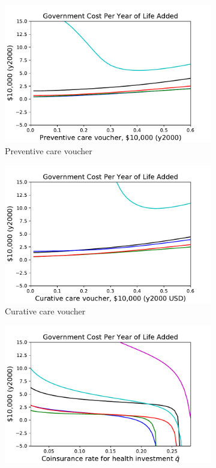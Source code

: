 \documentclass[12pt,pdftex,letterpaper]{article}
\begin{document}
\begin{figure}[h!]
    \centering
    \begin{subfigure}[b]{0.45\textwidth}
        \centering
        \includegraphics[width=\textwidth]{../Figures/PreventiveSubCostPerYear.pdf}
        \caption{Preventive care voucher}
    \end{subfigure}
    \begin{subfigure}[b]{0.45\textwidth}
        \centering
        \includegraphics[width=\textwidth]{../Figures/CurativeSubCostPerYear.pdf}
        \caption{Curative care voucher}
    \end{subfigure}
    \begin{subfigure}[b]{0.45\textwidth}
        \centering
        \includegraphics[width=\textwidth]{../Figures/FlatCopayInvstCostPerYearZoom.pdf}

\end{subfigure}
\end{figure}
\end{document}
